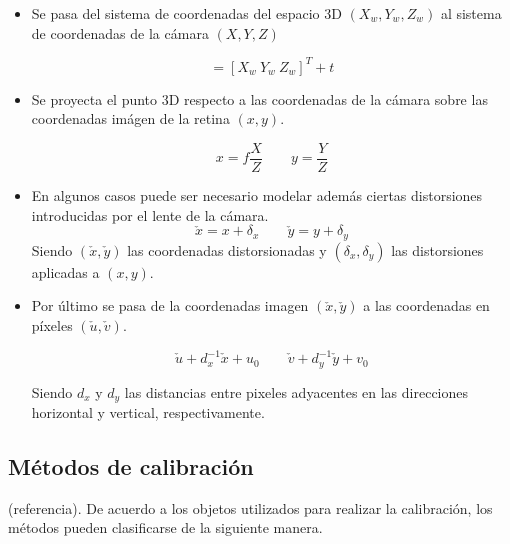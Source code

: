\begin{itemize}
\item Se pasa del sistema de coordenadas del espacio 3D $(X_w, Y_w, Z_w)$ al sistema de coordenadas de la cámara $(X,Y, Z)$

\begin{equation}
[X \ Y \ Z] = [X_w \ Y_w \ Z_w]^T + t
\end{equation}

\item Se proyecta el punto 3D respecto a las coordenadas de la cámara sobre las coordenadas imágen de la retina $(x,y)$.

\begin{equation}
x=f \dfrac{X}{Z} \qquad y = \dfrac{Y}{Z}
\end{equation}

\item En algunos casos puede ser necesario modelar además ciertas distorsiones introducidas por el lente de la cámara. \\

\begin{equation}
\check{x} = x + \delta_x \qquad \check{y} = y + \delta_y
\end{equation}
Siendo $(\check{x},\check{y})$ las coordenadas distorsionadas y $(\delta_x, \delta_y)$ las distorsiones aplicadas a $(x,y)$.

\item Por último se pasa de la coordenadas imagen $(\check{x}, \check{y})$ a las coordenadas en píxeles $(\check{u}, \check{v})$.

\begin{equation}
\check{u} + d_x ^{-1}\check{x} + u_0 \qquad \check{v} + d_y ^{-1}\check{y} + v_0
\end{equation}

Siendo $d_x$ y $d_y$ las distancias entre pixeles adyacentes en las direcciones horizontal y vertical, respectivamente.\\
\end{itemize}


\subsection{Métodos de calibración}

(referencia). De acuerdo a los objetos utilizados para realizar la calibración, los métodos pueden clasificarse de la siguiente manera.\\

